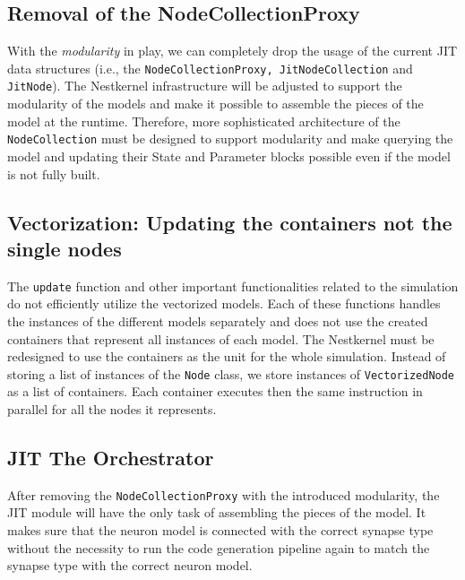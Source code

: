 \subsection*{Removal of the NodeCollectionProxy}

With the \emph{modularity} in play, we can completely drop the usage of the current JIT data structures (i.e., the \texttt{NodeCollectionProxy, JitNodeCollection} and \texttt{JitNode}). The Nestkernel infrastructure will be adjusted to support the modularity of the models and make it possible to assemble the pieces of the model at the runtime. Therefore, more sophisticated architecture of the \texttt{NodeCollection} must be designed to support modularity and make querying the model and updating their State and Parameter blocks possible even if the model is not fully built.


\subsection*{Vectorization: Updating the containers not the single nodes}

The \texttt{update} function and other important functionalities related to the simulation do not efficiently utilize the vectorized models. Each of these functions handles the instances of the different models separately and does not use the created containers that represent all instances of each model. The Nestkernel must be redesigned to use the containers as the unit for the whole simulation. Instead of storing a list of instances of the \texttt{Node} class, we store instances of \texttt{VectorizedNode} as a list of containers. Each container executes then the same instruction in parallel for all the nodes it represents.

\subsection*{JIT The Orchestrator}

After removing the \texttt{NodeCollectionProxy} with the introduced modularity, the JIT module will have the only task of assembling the pieces of the model. It makes sure that the neuron model is connected with the correct synapse type without the necessity to run the code generation pipeline again to match the synapse type with the correct neuron model.

\cleardoublepage
